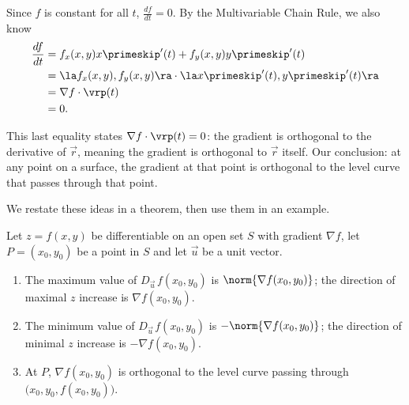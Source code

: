 Since $f$ is constant for all $t$, $\frac{df}{dt} = 0$. By the Multivariable Chain Rule, we also know
\begin{align*}
\frac{df}{dt} &= f_x(x,y)x\primeskip'(t) + f_y(x,y)y\primeskip'(t)\\						
						&= \la f_x(x,y),f_y(x,y)\ra \cdot \la x\primeskip'(t),y\primeskip'(t)\ra\\
						&= \nabla f \cdot \vrp(t)\\
						&=0.
\end{align*}

This last equality states $\nabla f \cdot \vrp(t) = 0$: the gradient is orthogonal to the derivative of $\vec r$, meaning the gradient is orthogonal to $\vec r$ itself. Our conclusion: at any point on a surface, the gradient at that point is orthogonal to the level curve that passes through that point.

We restate these ideas in a theorem, then use them in an example.
\enlargethispage{4\baselineskip}

{Let $z=f(x,y)$ be differentiable on an open set $S$ with gradient $\nabla f$, let $P=(x_0,y_0)$ be a point in $S$ and let $\vec u$ be a unit vector.
\begin{enumerate}
	\item The maximum value of $D_{\vec u\,}f(x_0,y_0)$ is $\norm{\nabla f(x_0,y_0)}$; the direction of maximal $z$ increase is $\nabla f(x_0,y_0)$.
	\item   The minimum value of $D_{\vec u\,}f(x_0,y_0)$ is $-\norm{\nabla f(x_0,y_0)}$; the direction of minimal $z$ increase is $-\nabla f(x_0,y_0)$.
	\item At $P$, $\nabla f(x_0,y_0)$ is orthogonal to the level curve passing through $\big(x_0,y_0,f(x_0,y_0)\big)$.
\end{enumerate}
}

